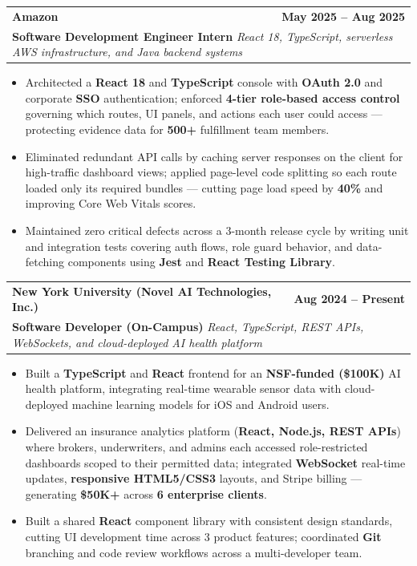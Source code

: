 \documentclass[letterpaper,10pt]{article}
\makeatletter
\newcommand{\resumeItem}[1]{
\item\small{{#1}\vspace{-3.5pt}}
}
\newcommand{\resumeSubheading}[4]{
\vspace{6pt}
\item
\begin{tabular*}{1.0\textwidth}[t]{l@{\extracolsep{\fill}}r}
\textbf{#1} & \textbf{\small #2} \\
\multicolumn{2}{l}{\textbf{\small#3} \textbar{} \textit{\small #4}} \\
\end{tabular*}\vspace{-5.5pt}
}
\newcommand{\resumeItemListStart}{\begin{itemize}[leftmargin=*, itemsep=0pt, topsep=0pt]}
\newcommand{\resumeItemListEnd}{\end{itemize}\vspace{-3pt}}
\makeatother
\begin{document}
\resumeSubheading
  {Amazon}{May 2025 -- Aug 2025}
  {Software Development Engineer Intern}{React 18, TypeScript, serverless AWS infrastructure, and Java backend systems}
\resumeItemListStart
  \resumeItem{Architected a \textbf{React 18} and \textbf{TypeScript} console with \textbf{OAuth 2.0} and corporate \textbf{SSO} authentication; enforced \textbf{4-tier role-based access control} governing which routes, UI panels, and actions each user could access — protecting evidence data for \textbf{500+} fulfillment team members.}
  \resumeItem{Eliminated redundant API calls by caching server responses on the client for high-traffic dashboard views; applied page-level code splitting so each route loaded only its required bundles — cutting page load speed by \textbf{40\%} and improving Core Web Vitals scores.}
  \resumeItem{Maintained zero critical defects across a 3-month release cycle by writing unit and integration tests covering auth flows, role guard behavior, and data-fetching components using \textbf{Jest} and \textbf{React Testing Library}.}
\resumeItemListEnd

\resumeSubheading
  {New York University (Novel AI Technologies, Inc.)}{Aug 2024 -- Present}
  {Software Developer (On-Campus)}{React, TypeScript, REST APIs, WebSockets, and cloud-deployed AI health platform}
\resumeItemListStart
  \resumeItem{Built a \textbf{TypeScript} and \textbf{React} frontend for an \textbf{NSF-funded (\$100K)} AI health platform, integrating real-time wearable sensor data with cloud-deployed machine learning models for iOS and Android users.}
  \resumeItem{Delivered an insurance analytics platform (\textbf{React, Node.js, REST APIs}) where brokers, underwriters, and admins each accessed role-restricted dashboards scoped to their permitted data; integrated \textbf{WebSocket} real-time updates, \textbf{responsive HTML5/CSS3} layouts, and Stripe billing — generating \textbf{\$50K+} across \textbf{6 enterprise clients}.}
  \resumeItem{Built a shared \textbf{React} component library with consistent design standards, cutting UI development time across 3 product features; coordinated \textbf{Git} branching and code review workflows across a multi-developer team.}
\resumeItemListEnd
\end{document}
